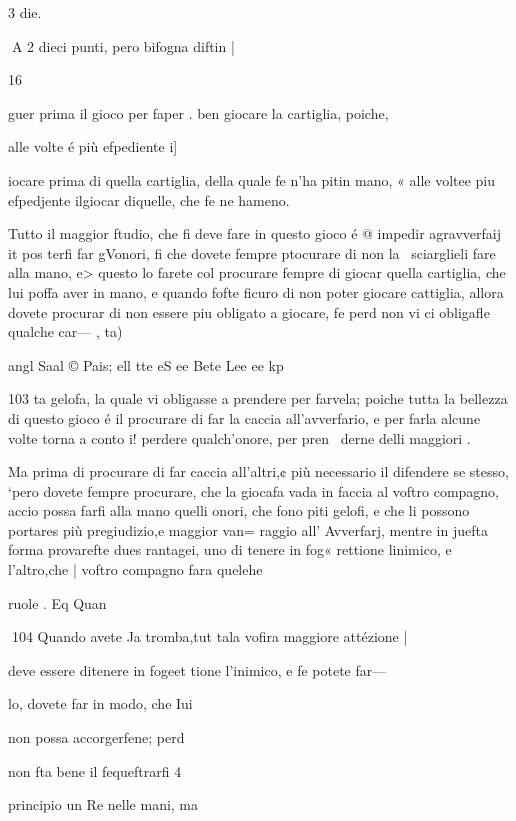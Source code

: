 \documentclass[12pt,a6paper]{article}
\begin{document}
3 die.

 

 

 
A 2
dieci punti, pero bifogna diftin |

16

guer prima il gioco per faper .
ben giocare la cartiglia, poiche,

alle volte é più efpediente i]

iocare prima di quella cartiglia, della quale fe n’ha pitin
mano, « alle voltee piu efpedjente ilgiocar diquelle, che
fe ne hameno.

Tutto il maggior ftudio, che
fi deve fare in questo gioco é
@ impedir agravverfaij it pos
terfi far gVonori, fi che dovete
fempre ptocurare di non la~
sciarglieli fare alla mano, e>
questo lo farete col procurare
fempre di giocar quella cartiglia, che lui poffa aver in mano, e quando fofte ficuro di non
poter giocare cattiglia, allora
dovete procurar di non essere
piu obligato a giocare, fe perd
non vi ci obligafle qualche car—
, ta)

 

angl Saal © Pais; ell tte eS ee Bete Lee ee kp

 
 

103
ta gelofa, la quale vi obligasse
a prendere per farvela; poiche
tutta la bellezza di questo gioco
é il procurare di far la caccia
all’avverfario, e per farla alcune volte torna a conto i! perdere qualch’onore, per pren~
derne delli maggiori .

Ma prima di procurare di far
caccia all’altri,¢ più necessario il
difendere se stesso, ‘pero dovete
fempre procurare, che la giocafa vada in faccia al voftro compagno, accio possa farfi alla mano quelli onori, che fono piti gelofi, e che li possono portares
più pregiudizio,e maggior van=
raggio all’ Avverfarj, mentre in
juefta forma provarefte dues
rantagei, uno di tenere in fog«
rettione linimico, e l’altro,che
| voftro compagno fara quelehe

ruole .
Eq Quan
 
104
Quando avete Ja tromba,tut
tala vofira maggiore attézione |

deve essere ditenere in fogeet
tione l’inimico, e fe potete far—

lo, dovete far in modo, che Iui

non possa accorgerfene; perd 

non fta bene il fequeftrarfi 4

principio un Re nelle mani, ma
\end{document}

